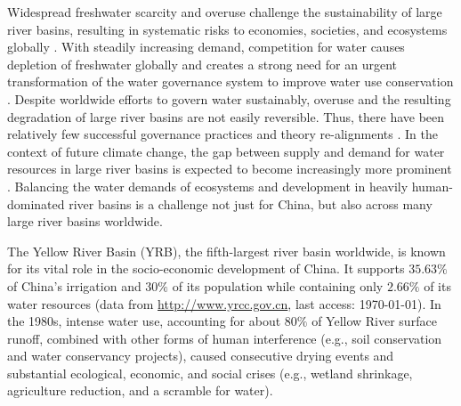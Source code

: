 Widespread freshwater scarcity and overuse challenge the sustainability of large river basins, resulting in systematic risks to economies, societies, and ecosystems globally \cite{distefano2017, dolan2021, xu2020b, mekonnen2016}.
With steadily increasing demand, competition for water causes depletion of freshwater globally and creates a strong need for an urgent transformation of the water governance system to improve water use conservation \cite{gleick2010, ziolkowska2016, wang2019d}.
Despite worldwide efforts to govern water sustainably, overuse and the resulting degradation of large river basins are not easily reversible. Thus, there have been relatively few successful governance practices and theory re-alignments
\cite{giuliani2013, falkenmark2019, jaeger2019}.
In the context of future climate change, the gap between supply and demand for water resources in large river basins is expected to become increasingly more prominent \cite{florke2018, yoon2021}.
Balancing the water demands of ecosystems and development in heavily human-dominated river basins is a challenge not just for China, but also across many large river basins worldwide.

The Yellow River Basin (YRB), the fifth-largest river basin worldwide, is known for its vital role in the socio-economic development of China.
It supports $35.63\%$ of China's irrigation and $30\%$ of its population while containing only $2.66\%$ of its water resources (data from \href{http://www.yrcc.gov.cn}{http://www.yrcc.gov.cn}, last access: \today).
In the 1980s, intense water use, accounting for about $80\%$ of Yellow River surface runoff, combined with other forms of human interference (e.g., soil conservation and water conservancy projects), caused consecutive drying events and substantial ecological, economic, and social crises (e.g., wetland shrinkage, agriculture reduction, and a scramble for water).

